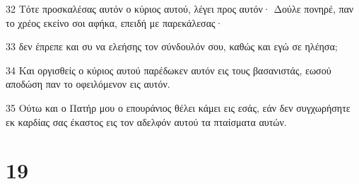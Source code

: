 \par 32 Τότε προσκαλέσας αυτόν ο κύριος αυτού, λέγει προς αυτόν· Δούλε πονηρέ, παν το χρέος εκείνο σοι αφήκα, επειδή με παρεκάλεσας·
\par 33 δεν έπρεπε και συ να ελεήσης τον σύνδουλόν σου, καθώς και εγώ σε ηλέησα;
\par 34 Και οργισθείς ο κύριος αυτού παρέδωκεν αυτόν εις τους βασανιστάς, εωσού αποδώση παν το οφειλόμενον εις αυτόν.
\par 35 Ούτω και ο Πατήρ μου ο επουράνιος θέλει κάμει εις εσάς, εάν δεν συγχωρήσητε εκ καρδίας σας έκαστος εις τον αδελφόν αυτού τα πταίσματα αυτών.

\chapter{19}

